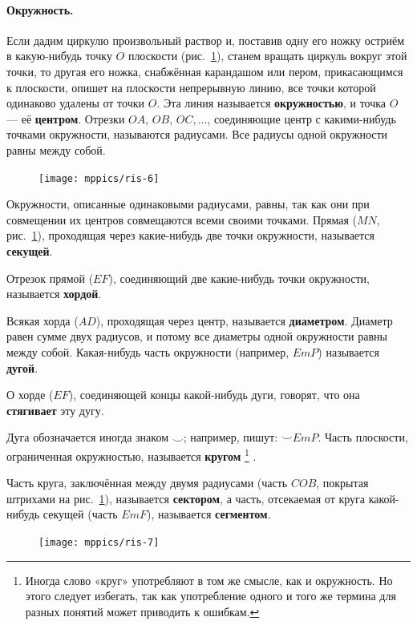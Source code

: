 \documentclass[oneside]{book}
\begin{document}
\paragraph{Окружность.}\label{1938/9}
Если дадим циркулю произвольный раствор и, поставив одну его ножку остриём в какую-нибудь точку $O$ плоскости (рис.~\ref{1938/ris-6}), станем вращать циркуль вокруг этой точки, то другая его ножка, снабжённая карандашом или пером, прикасающимся к плоскости, опишет на плоскости непрерывную линию, все точки которой одинаково удалены от точки $O$.
Эта линия называется \textbf{окружностью}, и точка $O$ — её \textbf{центром}.
Отрезки $OA$, $OB$, $OC,\dots$, соединяющие центр с какими-нибудь точками окружности, называются радиусами.
Все радиусы одной окружности равны между собой.

\begin{figure}
\centering
\texttt{[image: mppics/ris-6]}
\caption{}\label{1938/ris-6}
\end{figure}

Окружности, описанные одинаковыми радиусами, равны, так как они при совмещении их центров совмещаются всеми своими точками.
Прямая ($MN$, рис.~\ref{1938/ris-6}), проходящая через какие-нибудь две точки окружности, называется \textbf{секущей}.

Отрезок прямой ($EF$), соединяющий две какие-нибудь точки окружности, называется \textbf{хордой}.

Всякая хорда ($AD$), проходящая через центр, называется \textbf{диаметром}.
Диаметр равен сумме двух радиусов, и потому все диаметры одной окружности равны между собой.
Какая-нибудь часть окружности (например, $EmP$) называется \textbf{дугой}.

О хорде ($EF$), соединяющей концы какой-нибудь дуги, говорят, что она \textbf{стягивает} эту дугу.

Дуга обозначается иногда знаком $\smallsmile$;
например, пишут: ${\smallsmile} EmP$.
Часть плоскости, ограниченная окружностью, называется \textbf{кругом}%
\footnote{Иногда слово «круг» употребляют в том же смысле, как и окружность.
Но этого следует избегать, так как употребление одного и того же термина для разных понятий может приводить к ошибкам.}%
.

Часть круга, заключённая между двумя радиусами (часть $COB$, покрытая штрихами на рис.~\ref{1938/ris-6}), называется \textbf{сектором}, а часть, отсекаемая от круга какой-нибудь секущей (часть $EmF$), называется \textbf{сегментом}.

\begin{figure}
\centering
\texttt{[image: mppics/ris-7]}
\caption{}\label{1938/ris-7}
\end{figure}
\end{document}
